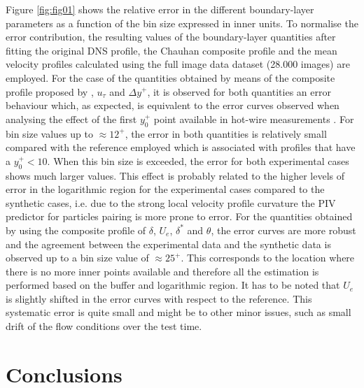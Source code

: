 Figure \ref{fig:fig01} shows the relative error in the different boundary-layer parameters as a function of the bin size expressed in inner units. To normalise the error contribution, the resulting values of the {boundary-layer} quantities after fitting the original DNS profile, the Chauhan composite profile and the mean velocity profiles calculated using the full image data dataset (28.000 images) are employed. For the case of the quantities obtained by means of the composite profile proposed by \citet{Chauhan:2009p10824}, $u_\tau$ and $\Delta y^+$, it is observed for both quantities an error behaviour which, as expected, is equivalent to the error curves observed when analysing the effect of the first $y_0^+$ point available in hot-wire measurements \citep{Chauhan:2009p10824,Orlu:2010p36071,Rodriguez-Lopez2015}. For bin size values up to $\approx 12^+$, the error in both quantities is relatively small compared with the reference employed which is associated with profiles that have a $y_0^+<10$. When this bin size is exceeded, the error for both experimental cases shows much larger values. This effect is probably related to the higher levels of error in the logarithmic region for the experimental cases compared to the synthetic cases{, i.e. due to the strong local velocity profile curvature the PIV predictor for particles pairing is more prone to error}. For the quantities obtained by using the composite profile of \citet{Nickels:2004p15662} $\delta$, $U_e$, $\delta^*$ and $\theta$, the error curves are more robust and the agreement between the experimental data and the synthetic data is observed up to a bin size value of $\approx 25^+$. This corresponds to the location where there is no more inner points available and therefore all the estimation is performed based on the buffer and logarithmic region. It has to be noted that $U_e$ is slightly shifted in the error curves with respect to the reference. %
This systematic error is quite small and might be to other minor issues, such as small drift of the flow conditions over the test time.

\section{Conclusions}

